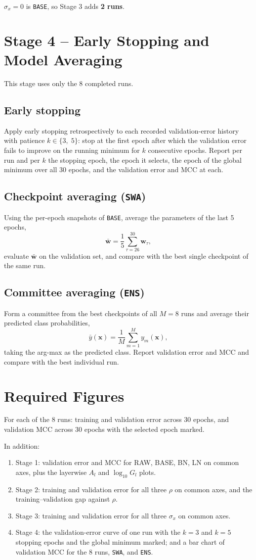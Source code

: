 \documentclass[11pt]{article}
\begin{document}
$\sigma_x=0$ is \texttt{BASE}, so Stage 3 adds \textbf{2 runs}.

\section{Stage 4 -- Early Stopping and Model Averaging}
This stage uses only the 8 completed runs.

\subsection*{Early stopping}
Apply early stopping retrospectively to each recorded validation-error history with patience $k \in \{3,\;5\}$: stop at the first epoch after which the validation error fails to improve on the running minimum for $k$ consecutive epochs. Report per run and per $k$ the stopping epoch, the epoch it selects, the epoch of the global minimum over all 30 epochs, and the validation error and MCC at each.

\subsection*{Checkpoint averaging (\texttt{SWA})}
Using the per-epoch snapshots of \texttt{BASE}, average the parameters of the last 5 epochs,
\[
\bar{\mathbf{w}} = \frac{1}{5}\sum_{\tau=26}^{30}\mathbf{w}_\tau ,
\]
evaluate $\bar{\mathbf{w}}$ on the validation set, and compare with the best single checkpoint of the same run.

\subsection*{Committee averaging (\texttt{ENS})}
Form a committee from the best checkpoints of all $M=8$ runs and average their predicted class probabilities,
\[
\bar{y}(\mathbf{x}) = \frac{1}{M}\sum_{m=1}^{M} y_m(\mathbf{x}),
\]
taking the arg-max as the predicted class. Report validation error and MCC and compare with the best individual run.

\section{Required Figures}
For each of the 8 runs: training and validation error across 30 epochs, and validation MCC across 30 epochs with the selected epoch marked.

In addition:
\begin{enumerate}
    \item Stage 1: validation error and MCC for RAW, BASE, BN, LN on common axes, plus the layerwise $A_l$ and $\log_{10}G_l$ plots.
    \item Stage 2: training and validation error for all three $\rho$ on common axes, and the training--validation gap against $\rho$.
    \item Stage 3: training and validation error for all three $\sigma_x$ on common axes.
    \item Stage 4: the validation-error curve of one run with the $k=3$ and $k=5$ stopping epochs and the global minimum marked; and a bar chart of validation MCC for the 8 runs, \texttt{SWA}, and \texttt{ENS}.
\end{enumerate}
\end{document}
